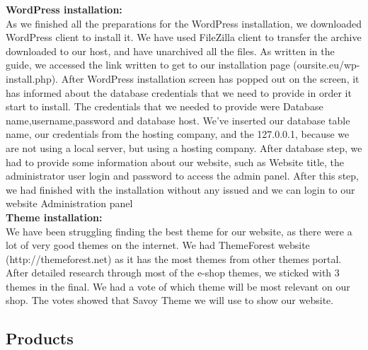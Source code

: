 \documentclass[12p]{article}
\begin{document}
\textbf{WordPress installation:}
\\
As we finished all the preparations for the WordPress installation, we downloaded WordPress client to install it. We have used FileZilla client to transfer the archive downloaded to our host, and have unarchived all the files. As written in the guide, we accessed the link written to get to our installation page (oursite.eu/wp-install.php). After WordPress installation screen has popped out on the screen, it has informed about the database credentials that we need to provide in order it start to install. The credentials that we needed to provide were Database name,username,password and database host. We’ve inserted our database table name, our credentials from the hosting company, and the 127.0.0.1, because we are not using a local server, but using a hosting company. After database step, we had to provide some information about our website, such as Website title, the administrator user login and password to access the admin panel. After this step, we had finished with the installation without any issued and we can login to our website Administration panel \\

\textbf{Theme installation:}
\\
We have been struggling finding the best theme for our website, as there were a lot of very good themes on the internet. We had ThemeForest website (http://themeforest.net) as it has the most themes from other themes portal. After detailed research through most of the e-shop themes, we sticked with 3 themes in the final. We had a vote of which theme will be most relevant on our shop. The votes showed that Savoy Theme we will use to show our website.

\subsection{Products}
\end{document}

